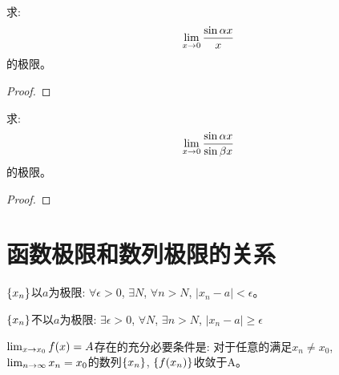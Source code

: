 \documentclass[lang=cn]{elegantbook}
\begin{document}
\begin{proposition}
    求:
    \[ \lim_{x \to 0 } \frac{\sin \alpha x}{x} \]
    的极限。
\end{proposition}
\begin{proof}
\end{proof}

\begin{proposition}
    求:
    \[ \lim_{x \to 0 } \frac{\sin \alpha x}{\sin \beta x} \]
    的极限。
\end{proposition}
\begin{proof}
    
\end{proof}

\section{函数极限和数列极限的关系}
\begin{theorem}[否定命题的分析表示]
    $\left\{ x_n\right\}$以$a$为极限: $\forall \epsilon > 0$, $\exists N$, $\forall n > N$, $\left| x_n - a \right| < \epsilon$。

    $\left\{ x_n\right\}$不以$a$为极限: $\exists \epsilon > 0$, $\forall N$, $\exists n > N$, $\left| x_n - a \right| \ge \epsilon$
\end{theorem}
\begin{theorem}[heine定理]
    $\lim_{x \to x_0 } f(x) = A$存在的充分必要条件是: 对于任意的满足$x_n \neq x_0$, $\lim_{n \to \infty } x_n = x_0$的数列$\left\{ x_n\right\}$, $\left\{ f(x_n)\right\}$收敛于A。
\end{theorem}
\end{document}
